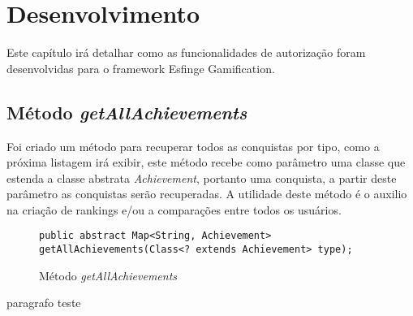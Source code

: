 \newpage
\chapter{Desenvolvimento}
\label{ch:desenvolvimento}

\par Este capítulo irá detalhar como as funcionalidades de autorização foram desenvolvidas para o framework Esfinge Gamification.

\section{Método \textit{getAllAchievements}}
\par Foi criado um método para recuperar todos as conquistas por tipo, como a próxima listagem irá exibir, este método recebe como parâmetro uma classe que estenda a classe abstrata \textit{Achievement}, portanto uma conquista, a partir deste parâmetro as conquistas serão recuperadas. A utilidade deste método é o auxilio na criação de rankings e/ou a comparações entre todos os usuários.

\begin{figure}[H]
    \centering
    \begin{lstlisting}
public abstract Map<String, Achievement> getAllAchievements(Class<? extends Achievement> type);
\end{lstlisting}
    \caption{Método \textit{getAllAchievements}}
    \label{fig:my_label}
\end{figure}

\par paragrafo teste